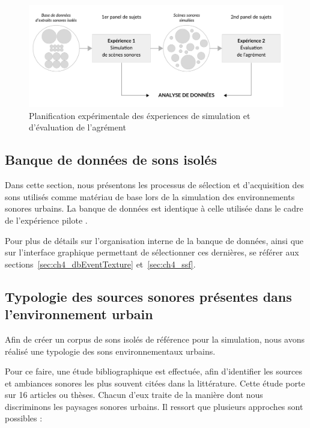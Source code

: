 \begin{figure}[t]
        \myfloatalign
        \includegraphics[width=.8\linewidth]{gfx/ch_5/5}
        \caption{Planification expérimentale des éxperiences de simulation et d'évaluation de l'agrément}\label{fig:xp1_2}
\end{figure}

\subsection{Banque de données de sons isolés}

Dans cette section, nous présentons les processus de sélection et d'acquisition des sons utilisés comme matériau de base lors de la simulation des environnements sonores urbains. La banque de données est identique à celle utilisée dans le cadre de l'expérience pilote \citep{lafay2013atiam,lafay2014new}. 

Pour plus de détails sur l'organisation interne de la banque de données, ainsi que sur l'interface graphique permettant de sélectionner ces dernières, se référer aux sections~\ref{sec:ch4_dbEventTexture} et~\ref{sec:ch4_ssf}.

\subsection[Typologie des sources sonores]{Typologie des sources sonores présentes dans l'environnement urbain}

Afin de créer un corpus de sons isolés de référence pour la simulation, nous avons réalisé une typologie des sons environnementaux urbains. 

Pour ce faire, une étude bibliographique est effectuée, afin d'identifier les sources et ambiances sonores les plus souvent citées dans la littérature. Cette étude porte sur 16 articles ou thèses. Chacun d'eux traite de la manière dont nous discriminons les paysages sonores urbains. Il ressort que plusieurs approches sont possibles :

